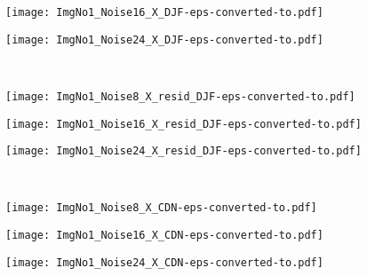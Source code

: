 \documentclass{article}
\begin{document}
\begin{figure*}[th]
\begin{multicols}{2}
\begin{minipage}[b]{0.28\linewidth}
			\centering
			\texttt{[image: ImgNo1\_Noise16\_X\_DJF-eps-converted-to.pdf]}
		\end{minipage} 
		\begin{minipage}[b]{0.28\linewidth}
			\centering
			\texttt{[image: ImgNo1\_Noise24\_X\_DJF-eps-converted-to.pdf]}
		\end{minipage} 
		\\
		\begin{minipage}[b]{0.1\linewidth}
		\end{minipage}  
		\begin{minipage}[b]{0.28\linewidth}
			\centering
			\texttt{[image: ImgNo1\_Noise8\_X\_resid\_DJF-eps-converted-to.pdf]}
		\end{minipage} 
		\begin{minipage}[b]{0.28\linewidth}
			\centering
			\texttt{[image: ImgNo1\_Noise16\_X\_resid\_DJF-eps-converted-to.pdf]}
		\end{minipage} 
		\begin{minipage}[b]{0.28\linewidth}
			\centering
			\texttt{[image: ImgNo1\_Noise24\_X\_resid\_DJF-eps-converted-to.pdf]}
		\end{minipage} 
		\\
		\begin{minipage}[b]{0.1\linewidth}
		\end{minipage} 
		\begin{minipage}[b]{0.28\linewidth}
			\centering
			\texttt{[image: ImgNo1\_Noise8\_X\_CDN-eps-converted-to.pdf]}
		\end{minipage} 
		\begin{minipage}[b]{0.28\linewidth}
			\centering
			\texttt{[image: ImgNo1\_Noise16\_X\_CDN-eps-converted-to.pdf]}
		\end{minipage} 
		\begin{minipage}[b]{0.28\linewidth}
			\centering
			\texttt{[image: ImgNo1\_Noise24\_X\_CDN-eps-converted-to.pdf]}
		\end{minipage} 
		\\
		\begin{minipage}[b]{0.1\linewidth}
		\end{minipage} 
		\begin{minipage}[b]{0.28\linewidth}

\end{minipage}
\end{multicols}
\end{figure*}
\end{document}

